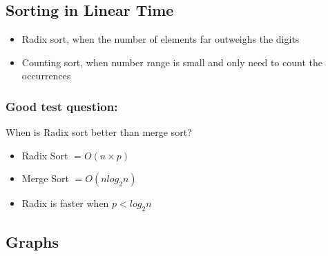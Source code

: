 \documentclass[12pt]{article}
\begin{document}
\subsection*{Sorting in Linear Time}

\begin{itemize}

    \item Radix sort, when the number of elements far outweighs the digits
    \item Counting sort, when number range is small and only need to count the occurrences

\end{itemize}

\subsubsection*{Good test question:}
When is Radix sort better than merge sort?
\begin{itemize}
    \item Radix Sort $ = O(n \times p)$
    \item Merge Sort $ = O(nlog_2n)$
    \item Radix is faster when $p < log_2n$
\end{itemize}

\subsection*{Graphs}
\end{document}
